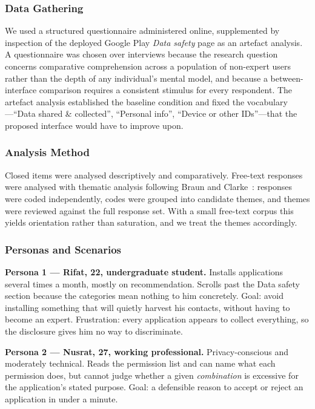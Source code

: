 \documentclass[sigconf]{acmart}
\begin{document}
\subsubsection{Data Gathering}
We used a structured questionnaire administered online, supplemented by
inspection of the deployed Google Play \emph{Data safety} page as an
artefact analysis. A questionnaire was chosen over interviews because the
research question concerns comparative comprehension across a population
of non-expert users rather than the depth of any individual's mental model,
and because a between-interface comparison requires a consistent stimulus
for every respondent. The artefact analysis established the baseline
condition and fixed the vocabulary---``Data shared \& collected'',
``Personal info'', ``Device or other IDs''---that the proposed interface
would have to improve upon.

\subsubsection{Analysis Method}
Closed items were analysed descriptively and comparatively. Free-text
responses were analysed with thematic analysis following Braun and
Clarke~\cite{braun2006thematic}: responses were coded independently, codes
were grouped into candidate themes, and themes were reviewed against the
full response set. With a small free-text corpus this yields orientation
rather than saturation, and we treat the themes accordingly.

\subsubsection{Personas and Scenarios}

\textbf{Persona 1 --- Rifat, 22, undergraduate student.} Installs
applications several times a month, mostly on recommendation. Scrolls past
the Data safety section because the categories mean nothing to him
concretely. Goal: avoid installing something that will quietly harvest his
contacts, without having to become an expert. Frustration: every
application appears to collect everything, so the disclosure gives him no
way to discriminate.

\textbf{Persona 2 --- Nusrat, 27, working professional.} Privacy-conscious
and moderately technical. Reads the permission list and can name what each
permission does, but cannot judge whether a given \emph{combination} is
excessive for the application's stated purpose. Goal: a defensible reason
to accept or reject an application in under a minute.
\end{document}
